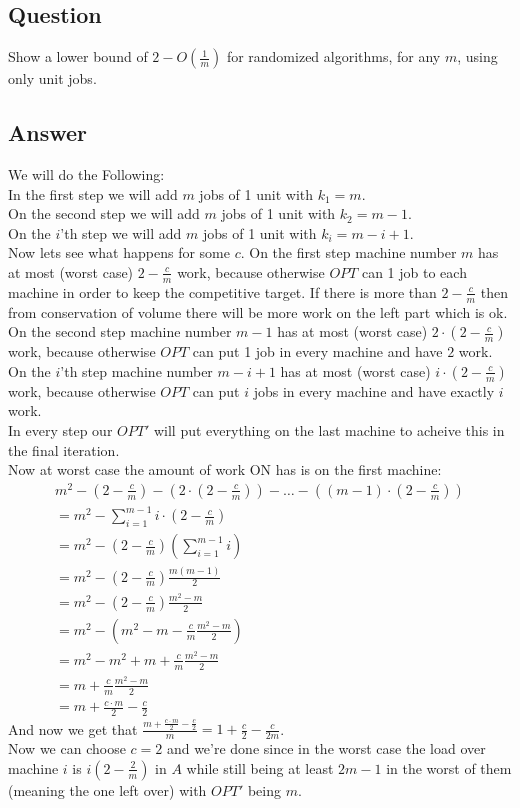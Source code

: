 \subsection{Question}
Show a lower bound of $2-O(\frac{1}{m})$ for randomized algorithms, for any $m$, using only unit jobs.

\subsection{Answer}
We will do the Following:\\
In the first step we will add $m$ jobs of 1 unit with $k_{1}=m$.\\
On the second step we will add $m$ jobs of 1 unit with $k_{2}=m-1$.\\
On the $i$'th step we will add $m$ jobs of 1 unit with $k_{i}=m-i+1$.\\
Now lets see what happens for some $c$. On the first step machine number $m$ has at most (worst case) $2-\frac{c}{m}$ work, because otherwise $OPT$ can 1 job to each machine in order to keep the competitive target. If there is more than $2-\frac{c}{m}$ then from conservation of volume there will be more work on the left part which is ok.\\
On the second step machine number $m-1$ has at most (worst case) $2\cdot(2-\frac{c}{m})$ work, because otherwise $OPT$ can put 1 job in every machine and have $2$ work.\\
On the $i$'th step machine number $m-i+1$ has at most (worst case) $i\cdot(2-\frac{c}{m})$ work, because otherwise $OPT$ can put $i$ jobs in every machine and have exactly $i$ work.\\
In every step our $OPT'$ will put everything on the last machine to acheive this in the final iteration.\\
Now at worst case the amount of work ON has is on the first machine:
\begin{gather*}
m^2 - \left( 2-\frac{c}{m} \right) - \left( 2 \cdot \left(2-\frac{c}{m}\right) \right) - \dots - \left( (m-1)\cdot\left(2-\frac{c}{m}\right) \right)\\
= m^2 - \sum_{i=1}^{m-1}i\cdot\left(2-\frac{c}{m}\right)\\
= m^2-\left(2-\frac{c}{m}\right)\left(\sum_{i=1}^{m-1}i\right)\\
= m^2- \left(2-\frac{c}{m}\right) \frac{m(m-1)}{2}\\
= m^2- \left(2-\frac{c}{m}\right) \frac{m^2 - m}{2}\\
= m^2- \left(m^2 - m-\frac{c}{m}\frac{m^2 - m}{2}\right) \\
= m^2 - m^2 + m + \frac{c}{m}\frac{m^2 - m}{2} \\
= m + \frac{c}{m}\frac{m^2 - m}{2} \\
= m+\frac{c\cdot m}{2} - \frac{c}{2}
\end{gather*}
And now we get that $\frac{m+\frac{c\cdot m}{2} - \frac{c}{2}}{m} = 1+\frac{c}{2} - \frac{c}{2m}$. \\
Now we can choose $c=2$ and we're done since in the worst case the load over machine $i$ is $i(2-\frac{2}{m})$ in $A$ while still being at least $2m-1$ in the worst of them (meaning the one left over) with $OPT'$ being $m$.